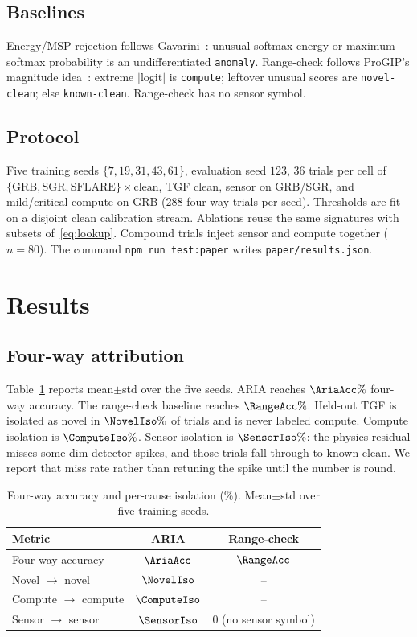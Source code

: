 \documentclass{ieeeaccess}
\begin{document}
\subsection{Baselines}
Energy/MSP rejection follows Gavarini~\cite{gavarini2022}: unusual softmax energy or maximum softmax probability is an undifferentiated \texttt{anomaly}. Range-check follows ProGIP's magnitude idea~\cite{progip2025}: extreme $\lvert\mathrm{logit}\rvert$ is \texttt{compute}; leftover unusual scores are \texttt{novel-clean}; else \texttt{known-clean}. Range-check has no sensor symbol.

\subsection{Protocol}
Five training seeds $\{7,19,31,43,61\}$, evaluation seed $123$, $36$ trials per cell of $\{\mathrm{GRB},\mathrm{SGR},\mathrm{SFLARE}\}\times\mathrm{clean}$, TGF clean, sensor on GRB/SGR, and mild/critical compute on GRB ($288$ four-way trials per seed). Thresholds are fit on a disjoint clean calibration stream. Ablations reuse the same signatures with subsets of~\eqref{eq:lookup}. Compound trials inject sensor and compute together ($n=80$). The command \texttt{npm run test:paper} writes \texttt{paper/results.json}.

\section{Results}

\subsection{Four-way attribution}
Table~\ref{tab:main} reports mean$\pm$std over the five seeds. ARIA reaches $\AriaAcc\%$ four-way accuracy. The range-check baseline reaches $\RangeAcc\%$. Held-out TGF is isolated as novel in $\NovelIso\%$ of trials and is never labeled compute. Compute isolation is $\ComputeIso\%$. Sensor isolation is $\SensorIso\%$: the physics residual misses some dim-detector spikes, and those trials fall through to known-clean. We report that miss rate rather than retuning the spike until the number is round.

\begin{table}[!t]
\caption{Four-way accuracy and per-cause isolation (\%). Mean$\pm$std over five training seeds.}
\label{tab:main}
\centering
\begin{tabular}{lcc}
\toprule
Metric & ARIA & Range-check \\
\midrule
Four-way accuracy & $\AriaAcc$ & $\RangeAcc$ \\
Novel $\to$ novel & $\NovelIso$ & -- \\
Compute $\to$ compute & $\ComputeIso$ & -- \\
Sensor $\to$ sensor & $\SensorIso$ & $0$ (no sensor symbol) \\
\bottomrule
\end{tabular}
\end{table}
\end{document}
